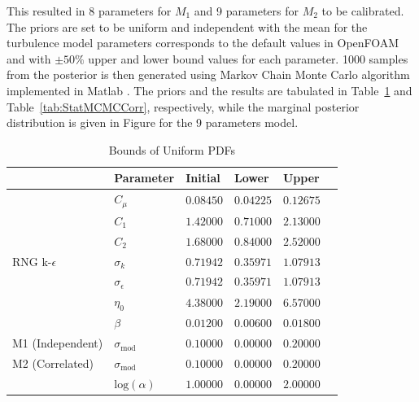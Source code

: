 \documentclass[11pt,titlepage]{article}
\begin{document}
This resulted in 8 parameters for $M_1$ and 9 parameters for $M_2$ to be calibrated. 
The priors are set to be uniform and independent with the mean for the turbulence model parameters corresponds to the default values in OpenFOAM and with $\pm50\%$ upper and lower bound values for each parameter. 
1000 samples from the posterior is then generated using Markov Chain Monte Carlo algorithm implemented in Matlab \cite{Haario2006}. 
The priors and the results are tabulated in Table~\ref{tab:BoundsOfUniformPDFs} and Table~\ref{tab:StatMCMCCorr}, respectively, while the marginal posterior distribution is given in Figure for the 9 parameters model.
\begin{table}[htbp]
	\centering
		\caption{Bounds of Uniform PDFs}
		\begin{tabular}{l l l l l l}
			\hline \hline
												&	Parameter										& Initial 	& Lower			& Upper 		\\
			\hline
												& $C_\mu$											& $0.08450$ & $0.04225$ & $0.12675$ \\
												& $C_1$												& $1.42000$ & $0.71000$ & $2.13000$ \\
										  	& $C_2$												& $1.68000$ & $0.84000$ & $2.52000$ \\
			RNG k-$\epsilon$ 	& $\sigma_k$									& $0.71942$ & $0.35971$ & $1.07913$ \\
										  	& $\sigma_\epsilon$					  & $0.71942$ & $0.35971$ & $1.07913$ \\
										  	& $\eta_0$										& $4.38000$ & $2.19000$ & $6.57000$ \\
										  	& $\beta$							   			& $0.01200$ & $0.00600$ & $0.01800$ \\
			M1 (Independent)	& $\sigma_{\text{mod}}$				& $0.10000$ & $0.00000$ & $0.20000$ \\
			M2 (Correlated)		& $\sigma_{\text{mod}}$				& $0.10000$ & $0.00000$ & $0.20000$ \\
										  	& $\text{log}(\alpha)$				& $1.00000$ & $0.00000$ & $2.00000$ \\
			\hline
		\end{tabular}
	\label{tab:BoundsOfUniformPDFs}
\end{table}
\end{document}
